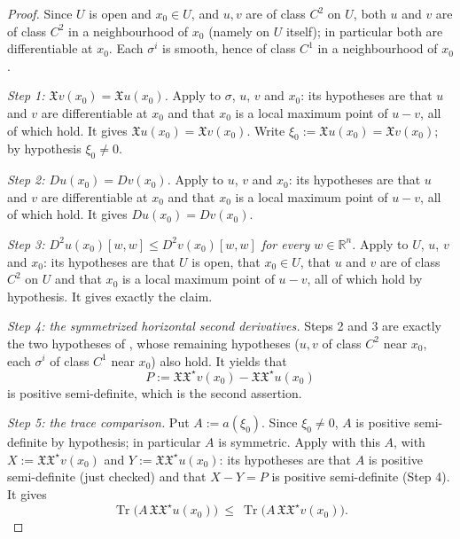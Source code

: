 \begin{proof}
Since $U$ is open and $x_0\in U$, and $u,v$ are of class $C^2$ on $U$, both $u$ and $v$ are of
class $C^2$ in a neighbourhood of $x_0$ (namely on $U$ itself); in particular both are
differentiable at $x_0$. Each $\sigma^i$ is smooth, hence of class $C^1$ in a neighbourhood of
$x_0$.

\emph{Step 1: $\mathfrak{X}v(x_0)=\mathfrak{X}u(x_0)$.} Apply  to
$\sigma$, $u$, $v$ and $x_0$: its hypotheses are that $u$ and $v$ are differentiable at $x_0$ and
that $x_0$ is a local maximum point of $u-v$, all of which hold. It gives
$\mathfrak{X}u(x_0)=\mathfrak{X}v(x_0)$. Write $\xi_0:=\mathfrak{X}u(x_0)=\mathfrak{X}v(x_0)$; by
hypothesis $\xi_0\neq0$.

\emph{Step 2: $Du(x_0)=Dv(x_0)$.} Apply  to $u$, $v$ and $x_0$: its
hypotheses are that $u$ and $v$ are differentiable at $x_0$ and that $x_0$ is a local maximum point
of $u-v$, all of which hold. It gives $Du(x_0)=Dv(x_0)$.

\emph{Step 3: $D^2u(x_0)[w,w]\leq D^2v(x_0)[w,w]$ for every $w\in\mathbb{R}^n$.} Apply
 to $U$, $u$, $v$ and $x_0$: its hypotheses are that $U$ is open,
that $x_0\in U$, that $u$ and $v$ are of class $C^2$ on $U$ and that $x_0$ is a local maximum point
of $u-v$, all of which hold by hypothesis. It gives exactly the claim.

\emph{Step 4: the symmetrized horizontal second derivatives.} Steps 2 and 3 are exactly the two
hypotheses of , whose remaining hypotheses ($u,v$ of class $C^2$
near $x_0$, each $\sigma^i$ of class $C^1$ near $x_0$) also hold. It yields that
$$P:=\mathfrak{X}\mathfrak{X}^\star v(x_0)-\mathfrak{X}\mathfrak{X}^\star u(x_0)$$
is positive semi-definite, which is the second assertion.

\emph{Step 5: the trace comparison.} Put $A:=a(\xi_0)$. Since $\xi_0\neq0$, $A$ is positive
semi-definite by hypothesis; in particular $A$ is symmetric. Apply  with
this $A$, with $X:=\mathfrak{X}\mathfrak{X}^\star v(x_0)$ and
$Y:=\mathfrak{X}\mathfrak{X}^\star u(x_0)$: its hypotheses are that $A$ is positive semi-definite
(just checked) and that $X-Y=P$ is positive semi-definite (Step 4). It gives
\begin{equation*}\operatorname{Tr}\Big(A\,\mathfrak{X}\mathfrak{X}^\star u(x_0)\Big)\ \leq\
\operatorname{Tr}\Big(A\,\mathfrak{X}\mathfrak{X}^\star v(x_0)\Big). \tag{2}\end{equation*}


\end{proof}
